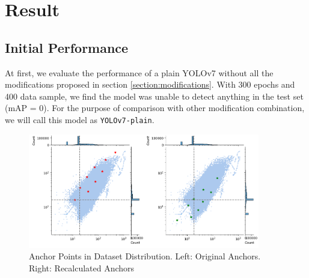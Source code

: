\documentclass[conference]{IEEEtran}
\begin{document}
\section{Result}
\subsection{Initial Performance}
At first, we evaluate the performance of a plain YOLOv7 without all the
modifications proposed in section \ref{section:modifications}.
With 300 epochs and 400 data sample, we find the model was unable to detect
anything in the test set (mAP = 0).
For the purpose of comparison with other modification combination,
we will call this model as \verb*|YOLOv7-plain|.

\begin{figure}
\centerline{\includegraphics[width=0.9\textwidth]{../book/figures/anchor-dist-2.png}}
\caption{Anchor Points in Dataset Distribution. Left: Original Anchors. Right: Recalculated Anchors}
\label{fig:anchor-recalculated}
\end{figure}
\end{document}
